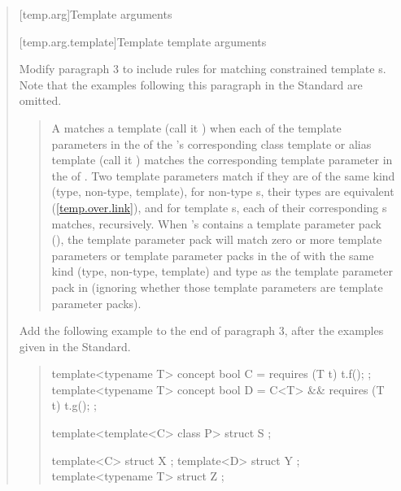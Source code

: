 \begin{quote}
[temp.arg]{Template arguments}

[temp.arg.template]{Template template arguments}

Modify paragraph 3 to include rules for matching constrained template 
s. Note that the examples following this 
paragraph in the \Cpp Standard are omitted.

\begin{quote}
\setcounter{Paras}{2}
\pnum
A  matches  a template 
  (call it ) when each of the 
template parameters in the  of the 
's corresponding class template or alias 
template (call it  ) matches the corresponding template parameter in 
the  of .
% 
Two template parameters match if they are of the same kind (type, non-type, 
template), for non-type s, their types are 
equivalent (\ref{temp.over.link}), and for template 
s, each of their corresponding
s matches, recursively. 
% 
When 's  
contains a template parameter pack (), the template 
parameter pack will match zero or more template parameters or template 
parameter packs in the  of
 with the same kind (type, non-type, template) and type as the template 
parameter pack in  (ignoring whether those template parameters are
template parameter packs).
\end{quote}

Add the following example to the end of paragraph 3, after the
examples given in the \Cpp Standard.

\begin{quote}
\begin{addedblock}
\enterexample
\begin{codeblock}
template<typename T> concept bool C = requires (T t) { t.f(); };
template<typename T> concept bool D = C<T> && requires (T t) { t.g(); };

template<template<C> class P>
  struct S { };

template<C> struct X { };
template<D> struct Y { };
template<typename T> struct Z { };


\end{codeblock}
\end{addedblock}
\end{quote}
\end{quote}
